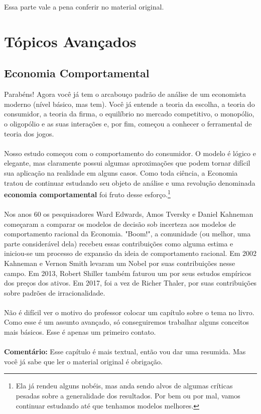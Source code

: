\documentclass[a4paper,11pt,oneside]{book}
\theoremstyle{definition}
\theoremstyle{break}
\begin{document}
Essa parte vale a pena conferir no material original.

\part{Tópicos Avançados}

\chapter{Economia Comportamental}

Parabéns! Agora você já tem o arcabouço padrão de análise de um economista moderno (nível básico, mas tem). Você já entende a teoria da escolha, a teoria do consumidor, a teoria da firma, o equilíbrio no mercado competitivo, o monopólio, o oligopólio e as suas interações e, por fim, começou a conhecer o ferramental de teoria dos jogos.
\\~\\
Nosso estudo começou com o comportamento do consumidor. O modelo é lógico e elegante, mas claramente possui algumas aproximações que podem tornar difícil sua aplicação na realidade em alguns casos. Como toda ciência, a Economia tratou de continuar estudando seu objeto de análise e uma revolução denominada \textbf{economia comportamental} foi fruto desse esforço.\footnote{Ela já rendeu alguns nobéis, mas anda sendo alvos de algumas críticas pesadas sobre a generalidade dos resultados. Por bem ou por mal, vamos continuar estudando até que tenhamos modelos melhores.}
\\~\\
Nos anos 60 os pesquisadores Ward Edwards, Amos Tversky e Daniel Kahneman começaram a comparar os modelos de decisão sob incerteza aos modelos de comportamento racional da Economia. "Boom!", a comunidade (ou melhor, uma parte considerável dela) recebeu essas contribuições como alguma estima e iniciou-se um processo de expansão da ideia de comportamento racional. Em 2002 Kahneman e Vernon Smith levaram um Nobel por suas contribuições nesse campo. Em 2013, Robert Shiller também faturou um por seus estudos empíricos dos preços dos ativos. Em 2017, foi a vez de Richer Thaler, por suas contribuições sobre padrões de irracionalidade.
\\~\\
Não é difícil ver o motivo do professor colocar um capítulo sobre o tema no livro. Como esse é um assunto avançado, só conseguiremos trabalhar alguns conceitos mais básicos. Esse é apenas um primeiro contato.
\\~\\
\textbf{Comentário:} Esse capítulo é mais textual, então vou dar uma resumida. Mas você já sabe que ler o material original é obrigação.
\end{document}
